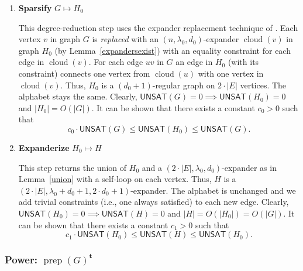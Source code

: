 \documentclass{article}
\newcommand{\UNSAT}{\mathsf{UNSAT}}
\newcommand{\prep}{{\operatorname{prep}}}
\newcommand{\cloud}{{\operatorname{cloud}}}
\begin{document}
\begin{enumerate}
\item \textbf{Sparsify} $G \mapsto H_0$

This degree-reduction step uses the expander replacement technique of
\cite{papadimitriou1991optimization}.
Each vertex $v$ in graph $G$ is \emph{replaced} with an $(n, \lambda_0, d_0)$-expander
$\cloud(v)$ in graph $H_0$ (by Lemma~\ref{expandersexist})
with an equality constraint for each edge in $\cloud(v)$.
For each edge $uv$ in $G$ an edge in $H_0$ (with its constraint)
connects one vertex from $\cloud(u)$ with one vertex in $\cloud(v)$.
Thus, $H_0$ is a $(d_0+1)$-regular graph on $2\cdot|E|$ vertices.
The alphabet stays the same.
Clearly, $\UNSAT(G)=0 \implies \UNSAT(H_0)=0$ and $|H_0|=O(|G|)$.
It can be shown that there exists a constant $c_0>0$ such that
$$
c_0\cdot\UNSAT(G) \le \UNSAT(H_0) \le \UNSAT(G). 
$$

\item \textbf{Expanderize} $H_0 \mapsto H$

This step returns the union of $H_0$ and a $(2\cdot|E|, \lambda_0, d_0)$-expander
as in Lemma~\ref{union} with a self-loop on each vertex.
Thus, $H$ is a $(2\cdot|E|, \lambda_0 + d_0 + 1, 2\cdot d_0 + 1)$-expander.
The alphabet is unchanged and we add trivial constraints
(i.e., one always satisfied)
to each new edge. %
Clearly, $\UNSAT(H_0)=0 \implies \UNSAT(H)=0$
and $|H|=O(|H_0|)=O(|G|)$.
It can be shown that there exists a constant $c_1>0$ such that
$$
c_1\cdot\UNSAT(H_0) \le \UNSAT(H) \le \UNSAT(H_0). 
$$

\end{enumerate}

\subsubsection*{Power: $\prep(G)^{\boldsymbol{t}}$}
\end{document}
